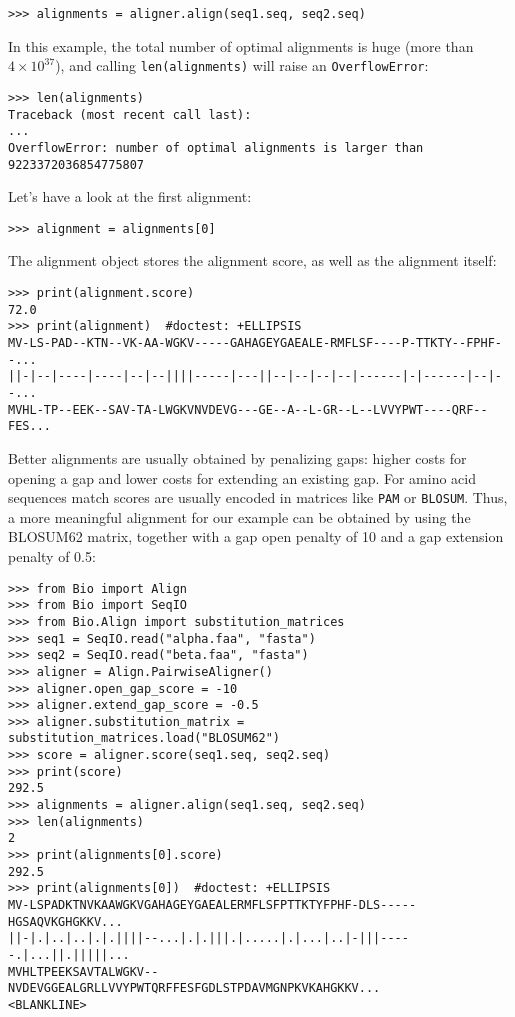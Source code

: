 \begin{verbatim}
>>> alignments = aligner.align(seq1.seq, seq2.seq)
\end{verbatim}
In this example, the total number of optimal alignments is huge (more than $4 \times 10^{37}$), and calling \verb+len(alignments)+ will raise an \verb+OverflowError+:

\begin{verbatim}
>>> len(alignments)
Traceback (most recent call last):
...
OverflowError: number of optimal alignments is larger than 9223372036854775807
\end{verbatim}
Let's have a look at the first alignment:

\begin{verbatim}
>>> alignment = alignments[0]
\end{verbatim}

The alignment object stores the alignment score, as well as the alignment
itself:

\begin{verbatim}
>>> print(alignment.score)
72.0
>>> print(alignment)  #doctest: +ELLIPSIS
MV-LS-PAD--KTN--VK-AA-WGKV-----GAHAGEYGAEALE-RMFLSF----P-TTKTY--FPHF--...
||-|--|----|----|--|--||||-----|---||--|--|--|--|------|-|------|--|--...
MVHL-TP--EEK--SAV-TA-LWGKVNVDEVG---GE--A--L-GR--L--LVVYPWT----QRF--FES...
\end{verbatim}

Better alignments are usually obtained by penalizing gaps: higher costs
for opening a gap and lower costs for extending an existing gap. For amino
acid sequences match scores are usually encoded in matrices like \texttt{PAM}
or \texttt{BLOSUM}. Thus, a more meaningful alignment for our example can be
obtained by using the BLOSUM62 matrix, together with a gap open penalty of 10
and a gap extension penalty of 0.5:

\begin{verbatim}
>>> from Bio import Align
>>> from Bio import SeqIO
>>> from Bio.Align import substitution_matrices
>>> seq1 = SeqIO.read("alpha.faa", "fasta")
>>> seq2 = SeqIO.read("beta.faa", "fasta")
>>> aligner = Align.PairwiseAligner()
>>> aligner.open_gap_score = -10
>>> aligner.extend_gap_score = -0.5
>>> aligner.substitution_matrix = substitution_matrices.load("BLOSUM62")
>>> score = aligner.score(seq1.seq, seq2.seq)
>>> print(score)
292.5
>>> alignments = aligner.align(seq1.seq, seq2.seq)
>>> len(alignments)
2
>>> print(alignments[0].score)
292.5
>>> print(alignments[0])  #doctest: +ELLIPSIS
MV-LSPADKTNVKAAWGKVGAHAGEYGAEALERMFLSFPTTKTYFPHF-DLS-----HGSAQVKGHGKKV...
||-|.|..|..|.|.||||--...|.|.|||.|.....|.|...|..|-|||-----.|...||.|||||...
MVHLTPEEKSAVTALWGKV--NVDEVGGEALGRLLVVYPWTQRFFESFGDLSTPDAVMGNPKVKAHGKKV...
<BLANKLINE>
\end{verbatim}

